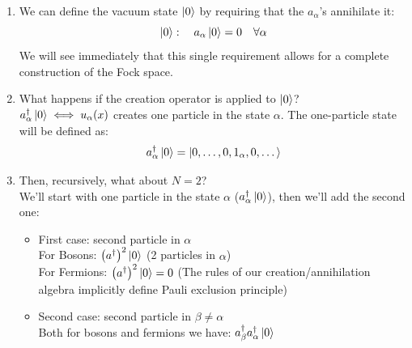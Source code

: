 \begin{enumerate}[label=\roman*.]
    \item We can define the vacuum state $\left|0\right\rangle$ by requiring that the $a_\alpha$'s annihilate it:
    $$\left|0\right\rangle :\quad a_\alpha \left|0\right\rangle = 0 \quad  \forall \alpha$$
    We will see immediately that this single requirement allows for a complete construction of the Fock space. 

    \item What happens if the creation operator is applied to $\left|0\right\rangle$?\\
    $a^\dag_\alpha\left|0\right\rangle \iff u_\alpha(x)$ creates one particle in the state $\alpha$. The one-particle state will be defined as:
    $$a^\dag_\alpha\left|0\right\rangle = \left|0,\dots, 0, 1_\alpha, 0,\dots\right\rangle$$

    \item Then, recursively, what about $N=2$?\\
    We'll start with one particle in the state $\alpha$ ($a_\alpha^\dag\left|0\right\rangle$), then we'll add the second one:
    \begin{itemize}
        \item First case: second particle in $\alpha$\\
        For Bosons: $\left(a^\dag\right)^2 \left|0\right\rangle$ \qquad (2 particles in $\alpha$)\\
        For Fermions: $\left(a^\dag\right)^2 \left|0\right\rangle = 0$ \qquad (The rules of our creation/annihilation algebra implicitly define Pauli exclusion principle)
        \item Second case: second particle in $\beta \ne \alpha$\\
        Both for bosons and fermions we have: $a_\beta^\dag a_\alpha^\dag \left|0\right\rangle$\\
    \end{itemize}


\end{enumerate}
